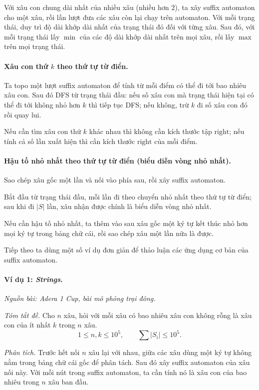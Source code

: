 \documentclass[11pt]{article}
\begin{document}
Với xâu con chung dài nhất của nhiều xâu (nhiều hơn \(2\)), ta xây suffix
automaton cho một xâu, rồi lần lượt đưa các xâu còn lại chạy trên automaton.
Với mỗi trạng thái, duy trì độ dài khớp dài nhất của trạng thái đó đối với từng
xâu. Sau đó, với mỗi trạng thái lấy \(\min\) của các độ dài khớp dài nhất trên
mọi xâu, rồi lấy \(\max\) trên mọi trạng thái.

\paragraph{Xâu con thứ \(k\) theo thứ tự từ điển.}
Ta topo một lượt suffix automaton để tính từ mỗi điểm có thể đi tới bao nhiêu
xâu con. Sau đó DFS từ trạng thái đầu: nếu số xâu con mà trạng thái hiện tại có
thể đi tới không nhỏ hơn \(k\) thì tiếp tục DFS; nếu không, trừ \(k\) đi số xâu
con đó rồi quay lui.

Nếu cần tìm xâu con thứ \(k\) khác nhau thì không cần kích thước tập
\(\mathrm{right}\); nếu tính cả số lần xuất hiện thì cần kích thước
\(\mathrm{right}\) của mỗi điểm.

\paragraph{Hậu tố nhỏ nhất theo thứ tự từ điển (biểu diễn vòng nhỏ nhất).}
Sao chép xâu gốc một lần và nối vào phía sau, rồi xây suffix automaton.

Bắt đầu từ trạng thái đầu, mỗi lần đi theo chuyển nhỏ nhất theo thứ tự từ điển;
sau khi đi \(|S|\) lần, xâu nhận được chính là biểu diễn vòng nhỏ nhất.

Nếu cần hậu tố nhỏ nhất, ta thêm vào sau xâu gốc một ký tự kết thúc nhỏ hơn mọi
ký tự trong bảng chữ cái, rồi sao chép xâu một lần nữa là được.

Tiếp theo ta dùng một số ví dụ đơn giản để thảo luận các ứng dụng cơ bản của
suffix automaton.

\paragraph{Ví dụ 1: \emph{Strings}.}
\emph{Nguồn bài: Adera 1 Cup, bài mô phỏng trại đông.}

\emph{Tóm tắt đề.}
Cho \(n\) xâu, hỏi với mỗi xâu có bao nhiêu xâu con không rỗng là xâu con của
ít nhất \(k\) trong \(n\) xâu.
\[
  1\le n,k\le 10^5,\qquad \sum |S_i|\le 10^5.
\]

\emph{Phân tích.}
Trước hết nối \(n\) xâu lại với nhau, giữa các xâu dùng một ký tự không nằm
trong bảng chữ cái gốc để phân tách. Sau đó xây suffix automaton của xâu nối
này. Với mỗi nút trong suffix automaton, ta cần tính nó là xâu con của bao
nhiêu trong \(n\) xâu ban đầu.
\end{document}
